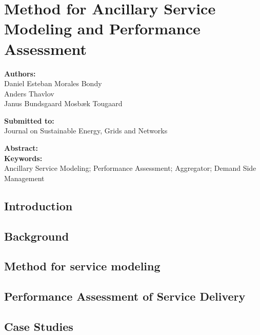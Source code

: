 \chapter{Method for Ancillary Service Modeling and Performance Assessment}
\label{app:segan}

\textbf{Authors:}\\
Daniel Esteban Morales Bondy\\
Anders Thavlov\\
Janus Bundsgaard Mosb{\ae}k Tougaard

\noindent
\textbf{Submitted to:}\\
Journal on Sustainable Energy, Grids and Networks 

\noindent
\textbf{Abstract:}\\


\noindent
\textbf{Keywords:}\\
Ancillary Service Modeling; Performance Assessment; Aggregator; Demand Side Management

\section{Introduction}


\section{Background}\label{sec:SEGANbackground}


\section{Method for service modeling}\label{sec:SEGANmethodology}


\section{Performance Assessment of Service Delivery}\label{sec:SEGANperformance}


\section{Case Studies}\label{sec:SEGANcasestudies}


